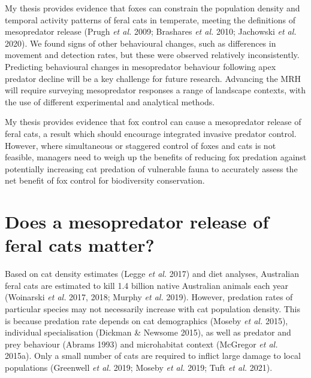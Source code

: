 \documentclass[11pt,a4paper,titlepage,twoside,openright]{style/unimelbthesis}
\begin{document}
\begin{mainmatter}
My thesis provides evidence that foxes can constrain the population density and temporal activity patterns of feral cats in temperate, meeting the definitions of mesopredator release (Prugh \emph{et al.} 2009; Brashares \emph{et al.} 2010; Jachowski \emph{et al.} 2020). We found signs of other behavioural changes, such as differences in movement and detection rates, but these were observed relatively inconsistently. Predicting behavioural changes in mesopredator behaviour following apex predator decline will be a key challenge for future research. Advancing the MRH will require surveying mesopredator responses a range of landscape contexts, with the use of different experimental and analytical methods.

My thesis provides evidence that fox control can cause a mesopredator release of feral cats, a result which should encourage integrated invasive predator control. However, where simultaneous or staggered control of foxes and cats is not feasible, managers need to weigh up the benefits of reducing fox predation against potentially increasing cat predation of vulnerable fauna to accurately assess the net benefit of fox control for biodiversity conservation.

\hypertarget{does-a-mesopredator-release-of-feral-cats-matter}{%
\section{Does a mesopredator release of feral cats matter?}\label{does-a-mesopredator-release-of-feral-cats-matter}}

Based on cat density estimates (Legge \emph{et al.} 2017) and diet analyses, Australian feral cats are estimated to kill 1.4 billion native Australian animals each year (Woinarski \emph{et al.} 2017, 2018; Murphy \emph{et al.} 2019). However, predation rates of particular species may not necessarily increase with cat population density. This is because predation rate depends on cat demographics (Moseby \emph{et al.} 2015), individual specialisation (Dickman \& Newsome 2015), as well as predator and prey behaviour (Abrams 1993) and microhabitat context (McGregor \emph{et al.} 2015a). Only a small number of cats are required to inflict large damage to local populations (Greenwell \emph{et al.} 2019; Moseby \emph{et al.} 2019; Tuft \emph{et al.} 2021).


\end{mainmatter}
\end{document}
